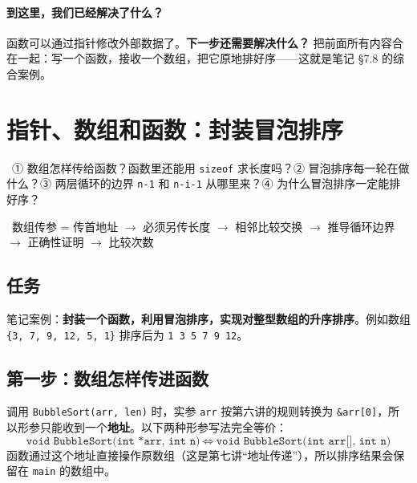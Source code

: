 \documentclass[UTF8,a4paper,11pt,fontset=none,zihao=-4]{ctexart}
\newcommand{\ci}[1]{{\circfont #1}}
\newcommand{\cpp}[1]{\lstinline[style=cpp,basicstyle=\ttfamily,numbers=none]{#1}}
\newcommand{\cc}[1]{\texttt{#1}}
\begin{document}
\paragraph{到这里，我们已经解决了什么？} 函数可以通过指针修改外部数据了。\textbf{下一步还需要解决什么？} 把前面所有内容合在一起：写一个函数，接收一个数组，把它原地排好序——这就是笔记 §7.8 的综合案例。

\section{指针、数组和函数：封装冒泡排序}\label{sec:bubble}
\ \ci{①} 数组怎样传给函数？函数里还能用 \cc{sizeof} 求长度吗？\ci{②} 冒泡排序每一轮在做什么？\ci{③} 两层循环的边界 \cc{n-1} 和 \cc{n-i-1} 从哪里来？\ci{④} 为什么冒泡排序一定能排好序？\par
{}\ 数组传参 = 传首地址 $\to$ 必须另传长度 $\to$ 相邻比较交换 $\to$ 推导循环边界 $\to$ 正确性证明 $\to$ 比较次数

\subsection{任务}
笔记案例：\textbf{封装一个函数，利用冒泡排序，实现对整型数组的升序排序}。例如数组 \cc{\{3, 7, 9, 12, 5, 1\}} 排序后为 \cc{1 3 5 7 9 12}。

\subsection{第一步：数组怎样传进函数}
\begin{definitionbox}[数组作函数参数]
调用 \cpp{BubbleSort(arr, len)} 时，实参 \cc{arr} 按第六讲的规则转换为 \cc{\&arr[0]}，所以形参只能收到一个\textbf{地址}。以下两种形参写法完全等价：
\[
\texttt{void BubbleSort(int *arr, int n)}\ \Longleftrightarrow\ \texttt{void BubbleSort(int arr[], int n)}
\]
函数通过这个地址直接操作原数组（这是第七讲“地址传递”），所以排序结果会保留在 \cc{main} 的数组中。
\end{definitionbox}
\end{document}
